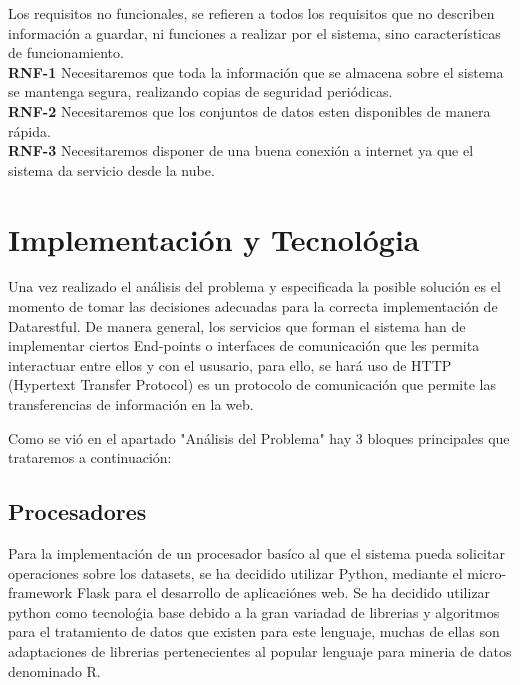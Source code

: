 \documentclass[a4paper,11pt]{book}
\begin{document}
Los requisitos no funcionales, se refieren a todos los requisitos que no describen información a guardar, ni funciones a realizar por el sistema, sino características de funcionamiento.\\


\textbf{RNF-1} Necesitaremos que toda la información que se almacena sobre el sistema se mantenga segura, realizando copias de seguridad periódicas. \\

\textbf{RNF-2} Necesitaremos que los conjuntos de datos esten disponibles de manera rápida. \\

\textbf{RNF-3} Necesitaremos disponer de una buena conexión a internet ya que el sistema da servicio desde la nube. \\ 


\section{Implementación y Tecnológia}

Una vez realizado el análisis del problema y especificada la posible solución es el momento de tomar las decisiones adecuadas para la correcta implementación de Datarestful. De manera general, los servicios que forman el sistema han de implementar ciertos End-points o interfaces de comunicación que les permita interactuar entre ellos y con el ususario, para ello, se hará uso de HTTP (Hypertext Transfer Protocol) es un protocolo de comunicación que permite las transferencias de información en la web. 

Como se vió en el apartado "Análisis del Problema" hay 3 bloques principales que trataremos a continuación:  

\subsection{Procesadores}

Para la implementación de un procesador basíco al que el sistema pueda solicitar operaciones sobre los datasets, se ha decidido utilizar Python\cite{py}, mediante el micro-framework Flask\cite{flask} para el desarrollo de aplicaciónes web. Se ha decidido utilizar python como tecnoloǵia base debido a la gran variadad de librerias y algoritmos para el tratamiento de datos que existen para este lenguaje, muchas de ellas son adaptaciones de librerias pertenecientes al popular lenguaje para mineria de datos denominado R. 
\end{document}
